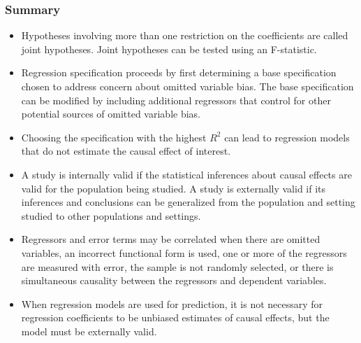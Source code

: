 

\begin{frame}
\frametitle{Summary}
\begin{itemize}
\item Hypotheses involving more than one restriction on the coefficients are called joint hypotheses. Joint hypotheses can be tested using an F-statistic.
\item Regression specification proceeds by first determining a base specification chosen to address concern about omitted variable bias. The base specification can be modified by including additional regressors that control for other potential sources of omitted variable bias. 
\item Choosing the specification with the highest $R^2$ can lead to regression models that do not estimate the causal effect of interest.
\item A study is internally valid if the statistical inferences about causal effects are valid for the population being studied. A study is externally valid if its inferences and conclusions can be generalized from the population and setting studied to other populations and settings.
\item Regressors and error terms may be correlated when there are omitted variables, an incorrect functional form is used, one or more of the regressors are measured with error, the sample is not randomly selected, or there is simultaneous causality between the regressors and dependent variables.
\item When regression models are used for prediction, it is not necessary for regression coefficients to be unbiased estimates of causal effects, but the model must be externally valid.
\end{itemize}
\end{frame}

